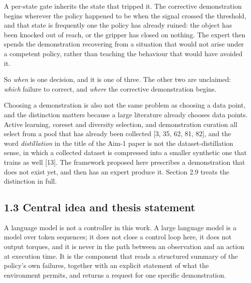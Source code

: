 \documentclass[
  11pt,
]{article}
\begin{document}
A per-state gate inherits the state that tripped it. The corrective
demonstration begins wherever the policy happened to be when the signal
crossed the threshold, and that state is frequently one the policy has
already ruined: the object has been knocked out of reach, or the gripper
has closed on nothing. The expert then spends the demonstration
recovering from a situation that would not arise under a competent
policy, rather than teaching the behaviour that would have avoided it.

So \emph{when} is one decision, and it is one of three. The other two
are unclaimed: \emph{which} failure to correct, and \emph{where} the
corrective demonstration begins.

Choosing a demonstration is also not the same problem as choosing a data
point, and the distinction matters because a large literature already
chooses data points. Active learning, coreset and diversity selection,
and demonstration curation all select from a pool that has already been
collected {[}3, 35, 62, 81, 82{]}, and the word \emph{distillation} in
the title of the Aim-1 paper is not the dataset-distillation sense, in
which a collected dataset is compressed into a smaller synthetic one
that trains as well {[}13{]}. The framework proposed here prescribes a
demonstration that does not exist yet, and then has an expert produce
it. Section 2.9 treats the distinction in full.

\hypertarget{central-idea-and-thesis-statement}{%
\subsection{1.3 Central idea and thesis
statement}\label{central-idea-and-thesis-statement}}

A language model is not a controller in this work. A large language
model is a model over token sequences; it does not close a control loop
here, it does not output torques, and it is never in the path between an
observation and an action at execution time. It is the component that
reads a structured summary of the policy's own failures, together with
an explicit statement of what the environment permits, and returns a
request for one specific demonstration.
\end{document}
